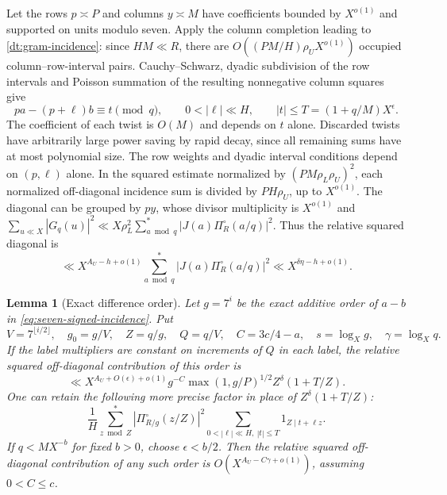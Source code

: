 \documentclass[11pt,a4paper]{article}
\theoremstyle{paperplain}
\newtheorem{lemma}[theorem]{Lemma}
\numberwithin{equation}{section}
\begin{document}
Let the rows $p\asymp P$ and columns $y\asymp M$ have coefficients bounded
by $X^{o(1)}$ and supported on units modulo seven. Apply the column completion leading to
\eqref{dt:gram-incidence}: since $HM\ll R$, there are
$O((PM/H)\rho_U X^{o(1)})$ occupied column--row-interval pairs.
Cauchy--Schwarz, dyadic subdivision of the row intervals and Poisson
summation of the resulting nonnegative column squares give
\begin{equation}
 p a-(p+\ell)b\equiv t\pmod q,\qquad
       0<|\ell|\ll H,\qquad |t|\le T=(1+q/M)X^\epsilon .
 \label{eq:seven-signed-incidence}
\end{equation}
The coefficient of each twist is $O(M)$ and depends on $t$ alone.
Discarded twists have arbitrarily large power saving by rapid decay,
since all remaining sums have at most polynomial size. The row weights
and dyadic interval conditions depend on $(p,\ell)$ alone. In the
squared estimate normalized by $(PM\rho_L\rho_U)^2$, each normalized
off-diagonal incidence sum is divided by $PH\rho_U$, up to $X^{o(1)}$.
The diagonal can be grouped by $py$, whose divisor multiplicity
is $X^{o(1)}$ and $\sum_{u\ll X}|G_q(u)|^2\ll
X\rho_L^2\sum_{a\bmod q}^{*}|J(a)\Pi_R^\circ(a/q)|^2$. Thus the
relative squared diagonal is
\begin{equation}
 \ll X^{A_U-h+o(1)} \sum_{a\bmod q}^{*}|J(a)\Pi_R^\circ(a/q)|^2
 \ll X^{\delta\eta-h+o(1)} .
 \label{eq:seven-signed-diagonal}
\end{equation}

\begin{lemma}[Exact difference order]\label{lem:seven-signed-lift}
Let $g=7^i$ be the exact additive order of $a-b$ in
\eqref{eq:seven-signed-incidence}. Put
\[
 V=7^{\lfloor i/2\rfloor},\quad g_0=g/V,\quad Z=q/g,\quad Q=q/V,
 \quad C=3c/4-a,\quad s=\log_Xg,\quad \gamma=\log_Xq .
\]
If the label multipliers are constant on increments of $Q$ in each
label, the relative squared off-diagonal contribution of this order is
\begin{equation}
 \ll X^{A_U+O(\epsilon)+o(1)}g^{-C}\max(1,g/P)^{1/2}
                    Z^\delta(1+T/Z).
 \label{eq:seven-lift-basic}
\end{equation}
One can retain the following more precise factor in place of
$Z^\delta(1+T/Z)$:
\begin{equation}
 \frac1H\sum_{z\bmod Z}^{*}|\Pi_{R/g}^\circ(z/Z)|^2
      \sum_{0<|\ell|\ll H,\ |t|\le T}1_{Z\mid t+\ell z}.
 \label{eq:seven-lift-precise}
\end{equation}
If $q<MX^{-b}$ for fixed $b>0$, choose $\epsilon<b/2$. Then the relative
squared off-diagonal contribution of any such order is
$O(X^{A_U-C\gamma+o(1)})$, assuming $0<C\le c$.
\end{lemma}
\end{document}
